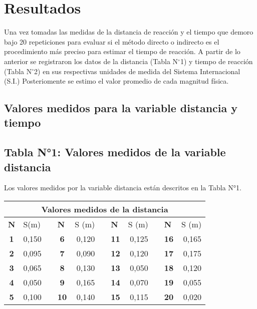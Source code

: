 \documentclass[runningheads]{llncs}
\begin{document}
    \section*{\centering Resultados}
    Una vez tomadas las medidas de la distancia de reacción y el tiempo que demoro bajo 20 repeticiones para evaluar si el método directo o indirecto es el procedimiento más preciso para estimar el tiempo de reacción. A partir de lo anterior se registraron los datos de la distancia (Tabla N$^{\circ}$1) y tiempo de reacción (Tabla N$^{\circ}$2) en sus respectivas unidades de medida del Sistema Internacional (S.I.) Posteriomente se estimo el valor promedio de cada magnitud física.
    \subsection*{Valores medidos para la variable distancia y tiempo} 
    \subsection*{Tabla N°1: Valores medidos de la variable distancia}
    Los valores medidos por la variable distancia están descritos en la Tabla N°1. \\
    \begin{table}[]
        \centering
        \begin{tabular}{crlcrlcrlcr}
            \\ \hline 
        \multicolumn{11}{c}{\textbf{Valores medidos de la distancia}}.\\ \hline 
        \multicolumn{1}{l}{\textbf{N}} & \multicolumn{1}{l}{S(m)} &  & \multicolumn{1}{l}{\textbf{N}} & \multicolumn{1}{l}{S (m)} &  & \multicolumn{1}{l}{\textbf{N}} & \multicolumn{1}{l}{S (m)} &  & \multicolumn{1}{l}{\textbf{N}} & \multicolumn{1}{l}{S (m)} \\ \hline
        \textbf{1} & 0,150 &  & \textbf{6} & 0,120 &  & \textbf{11} & 0,125 &  & \textbf{16} & 0,165 \\
        \textbf{2} & 0,095 &  & \textbf{7} & 0,090 &  & \textbf{12} & 0,120 &  & \textbf{17} & 0,175 \\
        \textbf{3} & 0,065 &  & \textbf{8} & 0,130 &  & \textbf{13} & 0,050 &  & \textbf{18} & 0,120 \\
        \textbf{4} & 0,050 &  & \textbf{9} & 0,165 &  & \textbf{14} & 0,070 &  & \textbf{19} & 0,055 \\
        \textbf{5} & 0,100 &  & \textbf{10} & 0,140 &  & \textbf{15} & 0,115 &  & \textbf{20} & 0,020 \\
        \end{tabular}
        \end{table}
    
\end{document}
